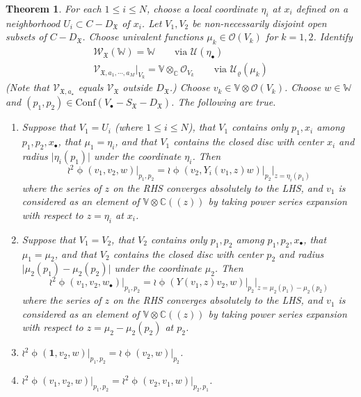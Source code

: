 \documentclass[11pt,b5paper,notitlepage]{article}
\theoremstyle{definition}
\theoremstyle{plain}
\newtheorem{thm}[df]{Theorem}
\newcommand{\fk}{\mathfrak}
\newcommand{\Conf}{\mathrm{Conf}}
\newcommand{\SV}{\mathscr{V}}
\newcommand{\scr}{\mathscr}
\newcommand{\DX}{D_{\fk X}}
\newcommand{\blt}{\bullet}
\newcommand{\Vbb}{\mathbb V}
\newcommand{\Wbb}{\mathbb W}
\newcommand{\Cbb}{\mathbb C}
\newcommand{\ibf}{\mathbf 1}
\newcommand{\<}{\left\langle}
\renewcommand{\>}{\right\rangle}
\newcommand{\MO}{\mathcal{O}}
\newcommand{\MU}{\mathcal{U}}
\newcommand{\fx}{\mathfrak{X}}
\newcommand{\SW}{\mathscr{W}}
\numberwithin{equation}{section}
\begin{document}
\begin{thm}\label{lb18}
For each $1\leq i\leq N$, choose a local coordinate $\eta_i$ at $x_i$ defined on a neighborhood $U_i\subset C-\DX$ of $x_i$. Let $V_1,V_2$ be non-necessarily disjoint open subsets of $C-\DX$. Choose univalent functions $\mu_k\in \MO(V_k)$ for $k=1,2$.  Identify
\begin{subequations}
\begin{gather}
\SW_\fx(\Wbb)=\Wbb\qquad\text{via }\MU(\eta_\blt)\\
\SV_{\fx,a_1,\cdots,a_M}\vert_{V_k}=\Vbb\otimes_\Cbb \MO_{V_k}\qquad\text{via }\MU_\varrho(\mu_k)
\end{gather}
\end{subequations}
(Note that $\scr V_{\fk X,a_\star}$ equals $\scr V_{\fk X}$ outside $\DX$.) Choose $v_k\in \Vbb\otimes\MO(V_k)$.   Choose $w\in \Wbb$ and $(p_1,p_2)\in \Conf(V_\blt-S_\fx-D_\fx)$. The following are true.
    \begin{enumerate}[label=(\arabic*)]
        \item Suppose that $V_1=U_i$ (where $1\leq i\leq N$), that $V_1$ contains only $p_1,x_i$ among $p_1,p_2,x_\blt$, that $\mu_1=\eta_i$, and that $V_1$ contains the closed disc with center $x_i$ and radius $\vert \eta_i(p_1)\vert$ under the coordinate $\eta_i$. Then
        $$
        \wr^2\upphi(v_1,v_2,w)\vert_{p_1,p_2}=\wr \upphi(v_2,Y_i(v_1,z)w)\vert_{p_2}\vert_{z=\eta_i(p_1)}
        $$
        where the series of $z$ on the RHS converges absolutely to the LHS, and $v_1$ is considered as an element of $\Vbb\otimes\Cbb((z))$ by taking power series expansion with respect to $z=\eta_i$ at $x_i$.
        \item Suppose that $V_1=V_2$, that $V_2$  contains only $p_1,p_2$ among $p_1,p_2,x_\blt$, that $\mu_1=\mu_2$, and that $V_2$ contains the closed disc with center $p_2$ and radius $\vert \mu_2(p_1)-\mu_2(p_2)\vert$ under the coordinate $\mu_2$. Then
        $$
        \wr^2\upphi(v_1,v_2,w_\blt)\vert_{p_1,p_2}=\wr\upphi(Y(v_1,z)v_2,w)\vert_{p_2}\vert_{z=\mu_2(p_1)-\mu_2(p_2)}
        $$
        where the series of $z$ on the RHS converges absolutely to the LHS, and $v_1$ is considered as an element of $\Vbb\otimes \Cbb((z))$ by taking power series expansion with respect to $z=\mu_2-\mu_2(p_2)$ at $p_2$.
        \item $\displaystyle         \wr^2\upphi(\ibf,v_2,w)\vert_{p_1,p_2}=\wr\upphi(v_2,w)\vert_{p_2}$.
        \item $\displaystyle         \wr^2 \upphi(v_1,v_2,w)\vert_{p_1,p_2}=\wr^2\upphi(v_2,v_1,w)\vert_{p_2,p_1}$.
    \end{enumerate}
\end{thm}
\end{document}
